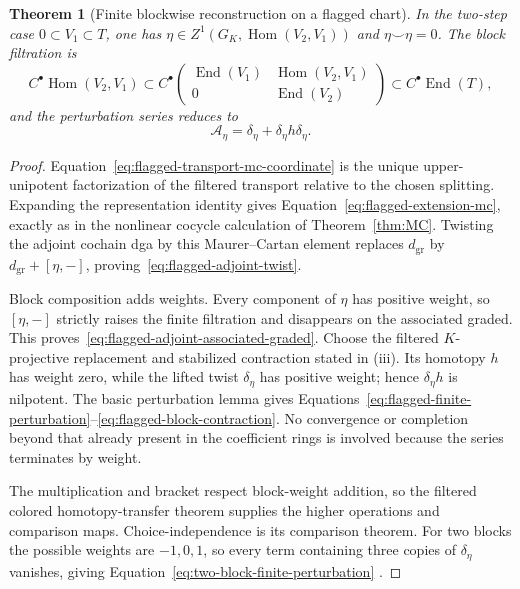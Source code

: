 \documentclass[11pt]{article}
\newtheorem{theorem}{Theorem}[section]
\theoremstyle{definition}
\begin{document}
\begin{theorem}[Finite blockwise reconstruction on a flagged chart]
In the two-step case $0\subset V_1\subset T$, one has
$\eta\in Z^1(G_K,\operatorname{Hom}(V_2,V_1))$ and
$\eta\smile\eta=0$.  The block filtration is
\[
C^\bullet\!\operatorname{Hom}(V_2,V_1)
\subset
C^\bullet\!\begin{pmatrix}
\operatorname{End}(V_1)&\operatorname{Hom}(V_2,V_1)\\
0&\operatorname{End}(V_2)
\end{pmatrix}
\subset
C^\bullet\!\operatorname{End}(T),
\]
and the perturbation series reduces to
\begin{equation}\label{eq:two-block-finite-perturbation}
\mathcal A_\eta
=\delta_\eta+\delta_\eta h\delta_\eta.
\end{equation}
\end{theorem}

\begin{proof}
Equation~\eqref{eq:flagged-transport-mc-coordinate} is the unique upper-unipotent factorization of the filtered transport relative to the chosen splitting.  Expanding the representation identity gives Equation~\eqref{eq:flagged-extension-mc}, exactly as in the nonlinear cocycle calculation of Theorem~\ref{thm:MC}.  Twisting the adjoint cochain dga by this Maurer--Cartan element replaces $d_{\mathrm{gr}}$ by $d_{\mathrm{gr}}+[\eta,-]$, proving~\eqref{eq:flagged-adjoint-twist}.

Block composition adds weights.  Every component of $\eta$ has positive weight, so $[\eta,-]$ strictly raises the finite filtration and disappears on the associated graded.  This proves~\eqref{eq:flagged-adjoint-associated-graded}.  Choose the filtered $K$-projective replacement and stabilized contraction stated in (iii).  Its homotopy $h$ has weight zero, while the lifted twist $\delta_\eta$ has positive weight; hence $\delta_\eta h$ is nilpotent.  The basic perturbation lemma gives Equations~\eqref{eq:flagged-finite-perturbation}--\eqref{eq:flagged-block-contraction}.  No convergence or completion beyond that already present in the coefficient rings is involved because the series terminates by weight.

The multiplication and bracket respect block-weight addition, so the filtered colored homotopy-transfer theorem supplies the higher operations and comparison maps.  Choice-independence is its comparison theorem.  For two blocks the possible weights are $-1,0,1$, so every term containing three copies of $\delta_\eta$ vanishes, giving Equation~\eqref{eq:two-block-finite-perturbation} \cite{BurkeTransfer,ManettiPerturbation,VokrinekHPT}.
\end{proof}
\end{document}
